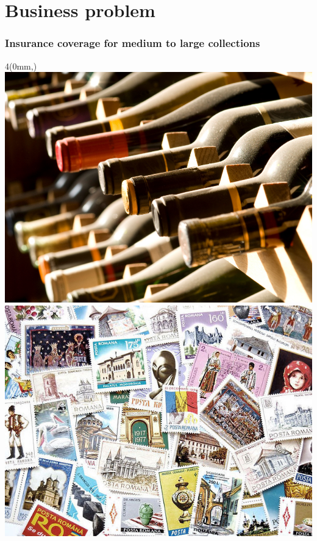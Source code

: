\section{Business problem}

\begin{frame}
  \frametitle{Insurance coverage for medium to large collections}

  \textblockorigin{0mm}{0mm}
  \begin{textblock*}{4\TPHorizModule}(0mm,\TPVertModule)
    \includegraphics*[height=1.5\TPVertModule,width=\TPHorizModule]{Wine-bottles}
    \includegraphics*[height=1.5\TPVertModule,width=\TPHorizModule]{631px-Many_Stamps_of_Romania}

\end{textblock*}
\end{frame}

